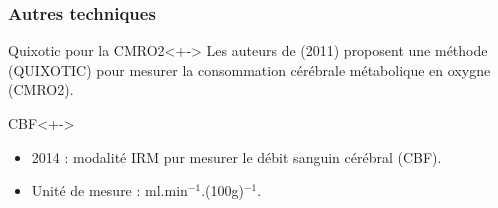 \begin{frame}
\frametitle{Autres techniques}
\begin{block}{Quixotic pour la CMRO2}<+->
Les auteurs de \cite{quixotic} (2011) proposent une m\'ethode (QUIXOTIC) pour mesurer la consommation c\'er\'ebrale m\'etabolique en oxygne (CMRO2).
\end{block}

\begin{block}{CBF}<+->
\begin{itemize}
\item<+-> 2014 : modalit\'e IRM pur mesurer le d\'ebit sanguin c\'er\'ebral (CBF).
\item<+-> Unit\'e de mesure : ml.min${}^{-1}$.(100g)${}^{-1}$.
\end{itemize}
\end{block}
\end{frame}


